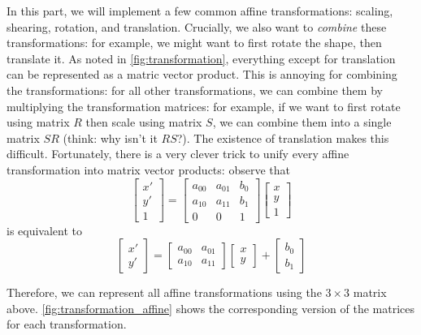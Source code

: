 In this part, we will implement a few common affine transformations: scaling, shearing, rotation, and translation. Crucially, we also want to \emph{combine} these transformations: for example, we might want to first rotate the shape, then translate it. As noted in \cref{fig:transformation}, everything except for translation can be represented as a matric vector product. This is annoying for combining the transformations: for all other transformations, we can combine them by multiplying the transformation matrices: for example, if we want to first rotate using matrix $R$ then scale using matrix $S$, we can combine them into a single matrix $S R$ (think: why isn't it $R S$?). The existence of translation makes this difficult. Fortunately, there is a very clever trick to unify every affine transformation into matrix vector products: observe that
\begin{equation}
\begin{bmatrix}
x' \\ y' \\ 1
\end{bmatrix}
=
\begin{bmatrix}
a_{00} & a_{01} & b_{0} \\
a_{10} & a_{11} & b_{1} \\
0 & 0 & 1
\end{bmatrix}
\begin{bmatrix}
x \\ y \\ 1
\end{bmatrix}
\end{equation}
is equivalent to
\begin{equation}
\begin{bmatrix}
x' \\ y'
\end{bmatrix}
=
\begin{bmatrix}
a_{00} & a_{01} \\
a_{10} & a_{11}
\end{bmatrix}
\begin{bmatrix}
x \\ y
\end{bmatrix}
+
\begin{bmatrix}
b_0 \\ b_1
\end{bmatrix}
\end{equation}

Therefore, we can represent all affine transformations using the $3 \times 3$ matrix above. \cref{fig:transformation_affine} shows the corresponding version of the matrices for each transformation.


